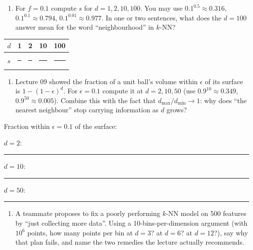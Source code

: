 \documentclass[
  11pt,
]{article}
\newcounter{none} %
\providecommand{\tightlist}{%
  \setlength{\itemsep}{0pt}\setlength{\parskip}{0pt}}
\newcommand{\answerspace}[1]{\par\vspace*{#1}}  %
\newcommand{\blank}[1][1.2in]{\rule{#1}{0.4pt}}
\newcommand{\answerpage}{\clearpage}
\begin{document}
\answerspace{3.8in}

\begin{enumerate}
\def\labelenumi{(\alph{enumi})}
\setcounter{enumi}{1}
\tightlist
\item
  For \(f = 0.1\) compute \(s\) for \(d = 1, 2, 10, 100\). You may use
  \(0.1^{0.5} \approx 0.316\), \(0.1^{0.1} \approx 0.794\),
  \(0.1^{0.01} \approx 0.977\). In one or two sentences, what does the
  \(d = 100\) answer mean for the word ``neighbourhood'' in \(k\)-NN?
\end{enumerate}

{\def\LTcaptype{none} %
\begin{longtable}[]{@{}lllll@{}}
\toprule\noalign{}
\(d\) & 1 & 2 & 10 & 100 \\
\midrule\noalign{}
\endhead
\bottomrule\noalign{}
\endlastfoot
\(s\) & \blank[0.8in] & \blank[0.8in] & \blank[0.8in] & \blank[0.8in] \\
\end{longtable}
}

\answerspace{1.2in}
\answerpage

\begin{enumerate}
\def\labelenumi{(\alph{enumi})}
\setcounter{enumi}{2}
\tightlist
\item
  Lecture 09 showed the fraction of a unit ball's volume within
  \(\epsilon\) of its surface is \(1 - (1-\epsilon)^d\). For
  \(\epsilon = 0.1\) compute it at \(d = 2, 10, 50\) (use
  \(0.9^{10} \approx 0.349\), \(0.9^{50} \approx 0.005\)). Combine this
  with the fact that \(d_{\max}/d_{\min} \to 1\): why does ``the nearest
  neighbour'' stop carrying information as \(d\) grows?
\end{enumerate}

Fraction within \(\epsilon = 0.1\) of the surface:

\(d = 2\): \blank[0.8in]\quad \(d = 10\): \blank[0.8in]\quad \(d = 50\):
\blank[0.8in]

\answerspace{2.8in}

\begin{enumerate}
\def\labelenumi{(\alph{enumi})}
\setcounter{enumi}{3}
\tightlist
\item
  A teammate proposes to fix a poorly performing \(k\)-NN model on 500
  features by ``just collecting more data''. Using a
  10-bins-per-dimension argument (with \(10^6\) points, how many points
  per bin at \(d = 3\)? at \(d = 6\)? at \(d = 12\)?), say why that plan
  fails, and name the two remedies the lecture actually recommends.
\end{enumerate}
\end{document}
